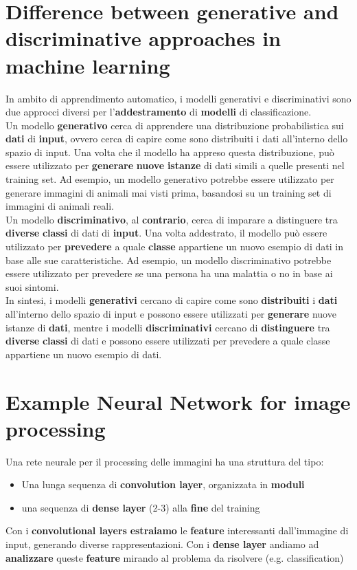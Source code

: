 \documentclass{article}
\begin{document}
\section{Difference between generative and discriminative
approaches in machine learning}
In ambito di apprendimento automatico, i modelli generativi e discriminativi sono due approcci diversi per l'\textbf{addestramento} di \textbf{modelli} di classificazione.
\\
Un modello \textbf{generativo} cerca di apprendere una distribuzione probabilistica sui \textbf{dati} di \textbf{input}, ovvero cerca di capire come sono distribuiti i dati all'interno dello spazio di input. Una volta che il modello ha appreso questa distribuzione, può essere utilizzato per \textbf{generare} \textbf{nuove} \textbf{istanze} di dati simili a quelle presenti nel training set.
 Ad esempio, un modello generativo potrebbe essere utilizzato per generare immagini di animali mai visti prima, basandosi su un training set di immagini di animali reali.
\\
Un modello \textbf{discriminativo}, al \textbf{contrario}, cerca di imparare a distinguere tra \textbf{diverse} \textbf{classi} di dati di \textbf{input}. Una volta addestrato, il modello può essere utilizzato per \textbf{prevedere} a quale \textbf{classe} appartiene un nuovo esempio di dati in base alle sue caratteristiche. Ad esempio, un modello discriminativo potrebbe essere utilizzato per prevedere se una persona ha una malattia o no in base ai suoi sintomi.
\\
In sintesi, i modelli \textbf{generativi} cercano di capire come sono \textbf{distribuiti} i \textbf{dati} all'interno dello spazio di input e possono essere utilizzati per \textbf{generare} nuove istanze di \textbf{dati}, mentre i modelli \textbf{discriminativi} cercano di \textbf{distinguere} tra \textbf{diverse} \textbf{classi} di dati e possono essere utilizzati per prevedere a quale classe appartiene un nuovo esempio di dati.

\section{Example Neural Network for image processing }
Una rete neurale per il processing delle immagini ha una struttura del tipo:
\begin{itemize}
    \item Una lunga sequenza di \textbf{convolution layer}, organizzata in \textbf{moduli}
    \item una sequenza di \textbf{dense layer} (2-3) alla \textbf{fine} del training
\end{itemize}
Con i \textbf{convolutional layers} \textbf{estraiamo} le \textbf{feature} interessanti dall'immagine di input, generando diverse rappresentazioni. Con i \textbf{dense layer} andiamo ad \textbf{analizzare} queste \textbf{feature} mirando al problema da risolvere (e.g. classification)
\end{document}
